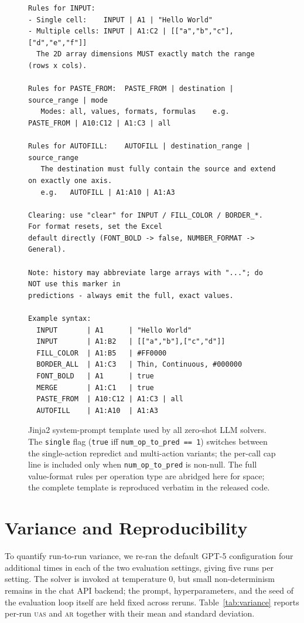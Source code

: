 \documentclass{article}
\theoremstyle{plain}
\theoremstyle{definition}
\theoremstyle{remark}
\begin{document}
\begin{figure}[t]
\begin{lstlisting}[style=pseudo,frame=single,basicstyle=\scriptsize\ttfamily,
                   numbers=none,showstringspaces=false,language={}]
Rules for INPUT:
- Single cell:    INPUT | A1 | "Hello World"
- Multiple cells: INPUT | A1:C2 | [["a","b","c"],["d","e","f"]]
  The 2D array dimensions MUST exactly match the range (rows x cols).

Rules for PASTE_FROM:  PASTE_FROM | destination | source_range | mode
   Modes: all, values, formats, formulas    e.g.   PASTE_FROM | A10:C12 | A1:C3 | all

Rules for AUTOFILL:    AUTOFILL | destination_range | source_range
   The destination must fully contain the source and extend on exactly one axis.
   e.g.   AUTOFILL | A1:A10 | A1:A3

Clearing: use "clear" for INPUT / FILL_COLOR / BORDER_*. For format resets, set the Excel
default directly (FONT_BOLD -> false, NUMBER_FORMAT -> General).

Note: history may abbreviate large arrays with "..."; do NOT use this marker in
predictions - always emit the full, exact values.

Example syntax:
  INPUT       | A1      | "Hello World"
  INPUT       | A1:B2   | [["a","b"],["c","d"]]
  FILL_COLOR  | A1:B5   | #FF0000
  BORDER_ALL  | A1:C3   | Thin, Continuous, #000000
  FONT_BOLD   | A1      | true
  MERGE       | A1:C1   | true
  PASTE_FROM  | A10:C12 | A1:C3 | all
  AUTOFILL    | A1:A10  | A1:A3
\end{lstlisting}
\caption{Jinja2 system-prompt template used by all zero-shot LLM solvers. The
\texttt{single} flag (\texttt{true} iff \texttt{num\_op\_to\_pred == 1}) switches between
the single-action repredict and multi-action variants; the per-call cap line is included
only when \texttt{num\_op\_to\_pred} is non-null. The full value-format rules per operation
type are abridged here for space; the complete template is reproduced verbatim in the
released code.}
\label{fig:solver-prompt}
\end{figure}




\section{Variance and Reproducibility}\label{app:variance}

To quantify run-to-run variance, we re-ran the default GPT-5 configuration four
additional times in each of the two evaluation settings, giving five runs per setting.
The solver is invoked at temperature 0, but small non-determinism remains in the chat API
backend; the prompt, hyperparameters, and the seed of the evaluation loop itself are held
fixed across reruns.
Table~\ref{tab:variance} reports per-run \textsc{uas} and \textsc{ar} together with their
mean and standard deviation.
\end{document}
